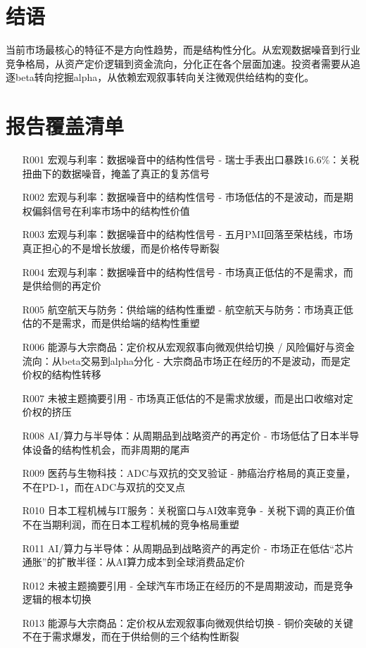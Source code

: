 \documentclass[11pt]{ctexart}
\begin{document}
\section{结语}
当前市场最核心的特征不是方向性趋势，而是结构性分化。从宏观数据噪音到行业竞争格局，从资产定价逻辑到资金流向，分化正在各个层面加速。投资者需要从追逐beta转向挖掘alpha，从依赖宏观叙事转向关注微观供给结构的变化。
\newpage
\section{报告覆盖清单}
\begin{itemize}
  \item [R001] 宏观与利率：数据噪音中的结构性信号 - 瑞士手表出口暴跌16.6\%：关税扭曲下的数据噪音，掩盖了真正的复苏信号
  \item [R002] 宏观与利率：数据噪音中的结构性信号 - 市场低估的不是波动，而是期权偏斜信号在利率市场中的结构性价值
  \item [R003] 宏观与利率：数据噪音中的结构性信号 - 五月PMI回落至荣枯线，市场真正担心的不是增长放缓，而是价格传导断裂
  \item [R004] 宏观与利率：数据噪音中的结构性信号 - 市场真正低估的不是需求，而是供给侧的再定价
  \item [R005] 航空航天与防务：供给端的结构性重塑 - 航空航天与防务：市场真正低估的不是需求，而是供给端的结构性重塑
  \item [R006] 能源与大宗商品：定价权从宏观叙事向微观供给切换 / 风险偏好与资金流向：从beta交易到alpha分化 - 大宗商品市场正在经历的不是波动，而是定价权的结构性转移
  \item [R007] 未被主题摘要引用 - 市场真正低估的不是需求放缓，而是出口收缩对定价权的挤压
  \item [R008] AI/算力与半导体：从周期品到战略资产的再定价 - 市场低估了日本半导体设备的结构性机会，而非周期的尾声
  \item [R009] 医药与生物科技：ADC与双抗的交叉验证 - 肺癌治疗格局的真正变量，不在PD-1，而在ADC与双抗的交叉点
  \item [R010] 日本工程机械与IT服务：关税窗口与AI效率竞争 - 关税下调的真正价值不在当期利润，而在日本工程机械的竞争格局重塑
  \item [R011] AI/算力与半导体：从周期品到战略资产的再定价 - 市场正在低估“芯片通胀”的扩散半径：从AI算力成本到全球消费品定价
  \item [R012] 未被主题摘要引用 - 全球汽车市场正在经历的不是周期波动，而是竞争逻辑的根本切换
  \item [R013] 能源与大宗商品：定价权从宏观叙事向微观供给切换 - 铜价突破的关键不在于需求爆发，而在于供给侧的三个结构性断裂

\end{itemize}
\end{document}
